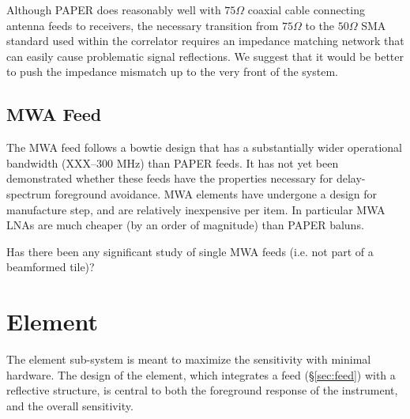 \documentclass[11pt]{article}
\begin{document}
Although PAPER does reasonably well with $75\Omega$ coaxial cable connecting antenna feeds to receivers,
the necessary transition from $75\Omega$ to the $50\Omega$ SMA standard used within the correlator requires
an impedance matching network that can easily cause problematic signal reflections.  We suggest that it
would be better to push the impedance mismatch up to the very front of the system.


\subsection{MWA Feed}

The MWA feed follows a bowtie design that has a substantially wider operational bandwidth (XXX--300 MHz) 
than PAPER feeds.  It has not yet been demonstrated whether these feeds have the properties necessary
for delay-spectrum foreground avoidance.  MWA elements have undergone a design for manufacture step, and
are relatively inexpensive per item.  In particular MWA LNAs are much cheaper (by an order of magnitude)
than PAPER baluns.

Has there been any significant study of single MWA feeds (i.e. not part of a beamformed tile)?


\section{Element}
\label{sec:element}

The element sub-system is meant to maximize the sensitivity with minimal
hardware.  The design of the element, which integrates a feed
(\S\ref{sec:feed}) with a reflective structure, is central to both the
foreground response of the instrument, and the overall sensitivity.
\end{document}
